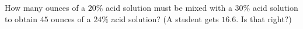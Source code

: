 How many ounces of a $20\%$ acid solution must be mixed with a $30\%$ acid solution to obtain $45$ ounces of a $24\%$ acid solution? (A student gets $16.6$. Is that right?)
